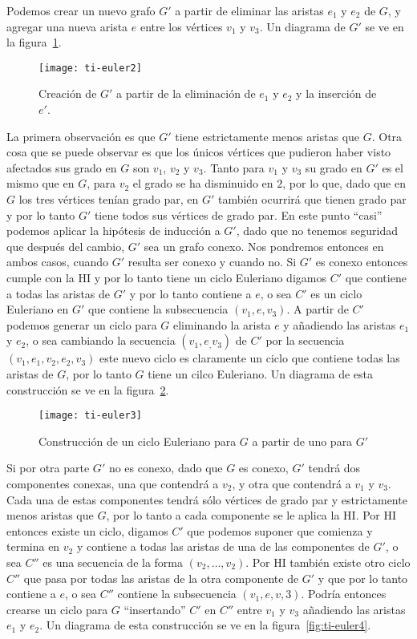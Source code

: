 \begin{teorema}
\begin{demostracion}
\begin{inducciondemo}
  Podemos crear un nuevo grafo $G'$ a partir de eliminar las aristas $e_1$ y $e_2$ de $G$, y agregar una nueva arista $e$ entre los vértices $v_1$ y $v_3$.
  Un diagrama de $G'$ se ve en la figura~\ref{fig:ti-euler2}.
  \begin{figure}[h!]
  \centering
  \texttt{[image: ti-euler2]}
  \caption{Creación de $G'$ a partir de la eliminación de $e_1$ y $e_2$ y la inserción de $e'$.}
  \label{fig:ti-euler2}
  \end{figure}
  La primera observación es que $G'$ tiene estrictamente menos aristas que $G$.
  Otra cosa que se puede observar es que los únicos vértices que pudieron haber visto afectados sus grado en $G$ son $v_1$, $v_2$ y $v_3$.
  Tanto para $v_1$ y $v_3$ su grado en $G'$ es el mismo que en $G$, para $v_2$ el grado se ha disminuido en $2$, por lo que, dado que en $G$ los tres vértices tenían grado par, en $G'$ también ocurrirá que tienen grado par y por lo tanto $G'$ tiene todos sus vértices de grado par.
  En este punto ``casi'' podemos aplicar la hipótesis de inducción a $G'$, dado que no tenemos seguridad que después del cambio, $G'$ sea un grafo conexo. 
  Nos pondremos entonces en ambos casos, cuando $G'$ resulta ser conexo y cuando no.
  Si $G'$ es conexo entonces cumple con la HI y por lo tanto tiene un ciclo Euleriano digamos $C'$ que contiene a todas las aristas de $G'$ y por lo tanto contiene a $e$, o sea $C'$ es un ciclo Euleriano en $G'$ que contiene la subsecuencia $(v_1,e,v_3)$.
  A partir de $C'$ podemos generar un ciclo para $G$ eliminando la arista $e$ y añadiendo las aristas $e_1$ y $e_2$, o sea cambiando la secuencia $(v_1,e_,v_3)$ de $C'$ por la secuencia $(v_1,e_1,v_2,e_2,v_3)$ este nuevo ciclo es claramente un ciclo que contiene todas las aristas de $G$, por lo tanto $G$ tiene un cilco Euleriano.
  Un diagrama de esta construcción se ve en la figura~\ref{fig:ti-euler3}.
  \begin{figure}[h!]
  \centering
  \texttt{[image: ti-euler3]}
  \caption{Construcción de un ciclo Euleriano para $G$ a partir de uno para $G'$}
  \label{fig:ti-euler3}
  \end{figure}
  
  Si por otra parte $G'$ no es conexo, dado que $G$ es conexo, $G'$ tendrá dos componentes conexas, una que contendrá a $v_2$, y otra que contendrá a $v_1$ y $v_3$.
  Cada una de estas componentes tendrá sólo vértices de grado par y estrictamente menos aristas que $G$, por lo tanto a cada componente se le aplica la HI.
  Por HI entonces existe un ciclo, digamos $C'$ que podemos suponer que comienza y termina en $v_2$ y contiene a todas las aristas de una de las componentes de $G'$, o sea $C''$ es una secuencia de la forma $(v_2,\ldots,v_2)$.
  Por HI también existe otro ciclo $C''$ que pasa por todas las aristas de la otra componente de $G'$ y que por lo tanto contiene a $e$, o sea $C''$ contiene la subsecuencia $(v_1,e,v,3)$.
  Podría entonces crearse un ciclo para $G$ ``insertando'' $C'$ en $C''$ entre $v_1$ y $v_3$ añadiendo las aristas $e_1$ y $e_2$.
  Un diagrama de esta construcción se ve en la figura~\ref{fig:ti-euler4}.
  

\end{inducciondemo}
\end{demostracion}
\end{teorema}
